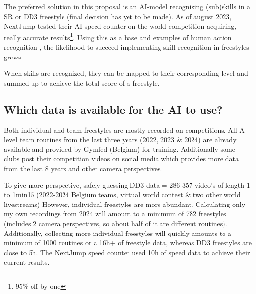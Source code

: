 The preferred solution in this proposal is an AI-model recognizing (sub)skills in a SR or DD3 freestyle (final decision has yet to be made). As of august 2023, \href{https://nextjump.app/}{NextJump} tested their AI-speed-counter on the world competition acquiring, really accurate results\footnote{95\% off by one}.
Using this as a base and examples of human action recognition \autocite{Yin_2024}, the likelihood to succeed implementing skill-recognition in freestyles grows.

When skills are recognized, they can be mapped to their corresponding level and summed up to achieve the total score of a freestyle.

\subsection{Which data is available for the AI to use?}

Both individual and team freestyles are mostly recorded on competitions. All A-level team routines from the last three years (2022, 2023 \& 2024) are already available and provided by Gymfed (Belgium) for training. Additionally some clubs post their competition videos on social media which provides more data from the last 8 years and other camera perspectives.

To give more perspective, safely guessing DD3 data = 286-357 video's of length 1 to 1min15 (2022-2024 Belgium teams, virtual world contest \& two other world livestreams)
However, individual freestyles are more abundant. Calculating only my own recordings from 2024 will amount to a minimum of 782 freestyles (includes 2 camera perspectives, so about half of it are different routines). Additionally, collecting more individual freestyles will quickly amounts to a minimum of 1000 routines or a 16h+ of freestyle data, whereas DD3 freestyles are close to 5h. The NextJump speed counter used 10h of speed data to achieve their current results.


    
